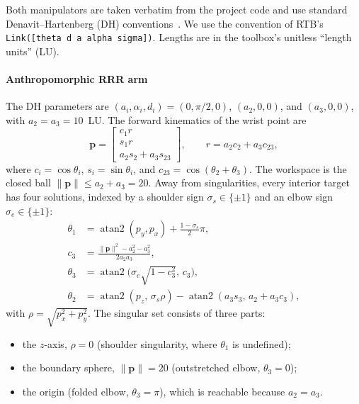 \documentclass[conference]{IEEEtran}
\newcommand{\p}{\mathbf{p}}
\newcommand{\atantwo}{\operatorname{atan2}}
\newcommand{\code}[1]{\texttt{#1}}
\begin{document}
Both manipulators are taken verbatim from the project code and use standard Denavit--Hartenberg (DH) conventions~\cite{denavit1955kinematic}. We use the convention of RTB's \code{Link([theta d a alpha sigma])}. Lengths are in the toolbox's unitless ``length units'' (LU).

\paragraph{Anthropomorphic RRR arm}
The DH parameters are $(a_i,\alpha_i,d_i)=(0,\pi/2,0)$, $(a_2,0,0)$, and $(a_3,0,0)$, with $a_2=a_3=10$~LU. The forward kinematics of the wrist point are
\begin{equation}
\label{eq:fk-rrr}
\p=\begin{bmatrix} c_1 r \\ s_1 r \\ a_2 s_2 + a_3 s_{23}\end{bmatrix},
\qquad r = a_2 c_2 + a_3 c_{23},
\end{equation}
where $c_i=\cos\theta_i$, $s_i=\sin\theta_i$, and $c_{23}=\cos(\theta_2+\theta_3)$. The workspace is the closed ball $\|\p\|\le a_2+a_3=20$. Away from singularities, every interior target has four solutions, indexed by a shoulder sign $\sigma_s\in\{\pm1\}$ and an elbow sign $\sigma_e\in\{\pm1\}$:
\begin{equation}
\label{eq:ik-rrr}
\begin{aligned}
\theta_1 &= \atantwo(p_y,p_x) + \tfrac{1-\sigma_s}{2}\pi,\\
c_3 &= \frac{\|\p\|^2-a_2^2-a_3^2}{2a_2a_3},\\
\theta_3 &= \atantwo\!\big(\sigma_e\sqrt{1-c_3^2},\,c_3\big),\\
\theta_2 &= \atantwo(p_z,\,\sigma_s\rho) - \atantwo(a_3 s_3,\,a_2 + a_3 c_3),
\end{aligned}
\end{equation}
with $\rho=\sqrt{p_x^2+p_y^2}$. The singular set consists of three parts:
\begin{itemize}
\item the $z$-axis, $\rho=0$ (shoulder singularity, where $\theta_1$ is undefined);
\item the boundary sphere, $\|\p\|=20$ (outstretched elbow, $\theta_3=0$);
\item the origin (folded elbow, $\theta_3=\pi$), which is reachable because $a_2=a_3$.
\end{itemize}
\end{document}
